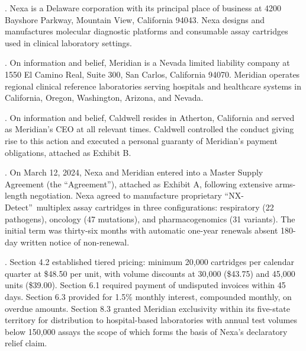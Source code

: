 \documentclass[12pt,letterpaper]{article}
\begin{document}

.\hspace{0.5em} Nexa is a Delaware corporation with its principal place of business at 4200 Bayshore Parkway, Mountain View, California 94043. Nexa designs and manufactures molecular diagnostic platforms and consumable assay cartridges used in clinical laboratory settings.

.\hspace{0.5em} On information and belief, Meridian is a Nevada limited liability company at 1550 El Camino Real, Suite 300, San Carlos, California 94070. Meridian operates regional clinical reference laboratories serving hospitals and healthcare systems in California, Oregon, Washington, Arizona, and Nevada.

.\hspace{0.5em} On information and belief, Caldwell resides in Atherton, California and served as Meridian's CEO at all relevant times. Caldwell controlled the conduct giving rise to this action and executed a personal guaranty of Meridian's payment obligations, attached as Exhibit B.


.\hspace{0.5em} On March 12, 2024, Nexa and Meridian entered into a Master Supply Agreement (the \textquotedblleft Agreement\textquotedblright), attached as Exhibit A, following extensive arms-length negotiation. Nexa agreed to manufacture proprietary \textquotedblleft NX-Detect\textquotedblright\ multiplex assay cartridges in three configurations: respiratory (22 pathogens), oncology (47 mutations), and pharmacogenomics (31 variants). The initial term was thirty-six months with automatic one-year renewals absent 180-day written notice of non-renewal.

.\hspace{0.5em} Section 4.2 established tiered pricing: minimum 20,000 cartridges per calendar quarter at \$48.50 per unit, with volume discounts at 30,000 (\$43.75) and 45,000 units (\$39.00). Section 6.1 required payment of undisputed invoices within 45 days. Section 6.3 provided for 1.5\% monthly interest, compounded monthly, on overdue amounts. Section 8.3 granted Meridian exclusivity within its five-state territory for distribution to hospital-based laboratories with annual test volumes below 150,000 assays \textemdash{} the scope of which forms the basis of Nexa's declaratory relief claim.
\end{document}
